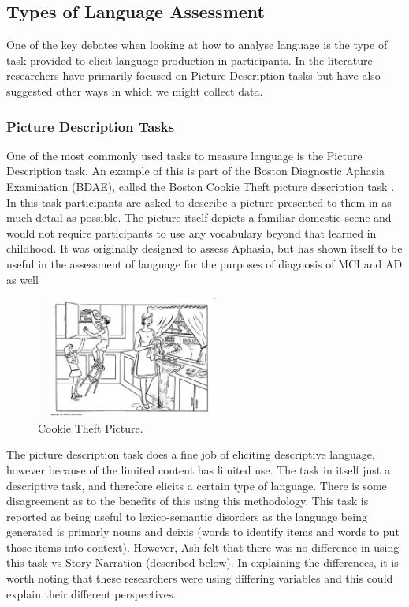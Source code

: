 \documentclass{article}
\begin{document}
\subsection {Types of Language Assessment}
One of the key debates when looking at how to analyse language is the type of task provided to elicit language production in participants. In the literature researchers have primarily focused on Picture Description tasks but have also suggested other ways in which we might collect data. \newline
\par
\subsubsection{Picture Description Tasks}
One of the most commonly used tasks to measure language is the Picture Description task. An example of this is part of the Boston Diagnostic Aphasia Examination (BDAE), called the Boston Cookie Theft picture description task \cite{Kaplan2010}. In this task participants are asked to describe a picture presented to them in as much detail as possible. The picture itself depicts a familiar domestic scene and would not require participants to use any vocabulary beyond that learned in childhood. It was originally designed to assess Aphasia, but has shown itself to be useful in the assessment of language for the purposes of diagnosis of MCI and AD as well \cite{Giles1996}\newline
\begin{figure}[H]
\centering
\includegraphics[width=240px, height=150px]{BCTPicture.png}
\caption{Cookie Theft Picture.\label{white}}
\end{figure}
\par
The picture description task does a fine job of eliciting descriptive language, however because of the limited content has limited use. The task in itself just a descriptive task, and therefore elicits a certain type of language. There is some disagreement as to the benefits of this using this methodology. This task is reported as being useful to lexico-semantic disorders \cite{Boschi2017, Sajjadi2012} as the language being generated is primarly nouns and deixis (words to identify items and words to put those items into context). However, Ash \cite{Ash2012}felt that there was no difference in using this task vs Story Narration (described below). In explaining the differences, it is worth noting that these researchers were using differing variables and this could explain their different perspectives. \newline
\end{document}
